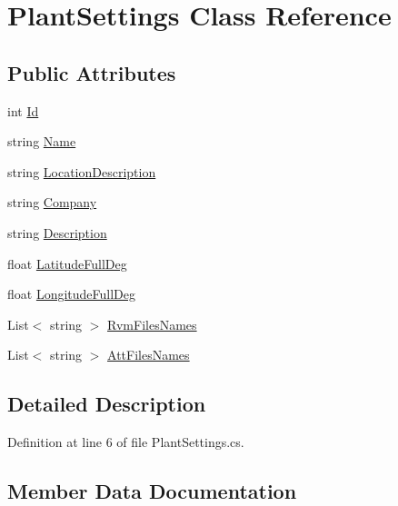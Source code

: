 \hypertarget{class_plant_settings}{}\section{Plant\+Settings Class Reference}
\label{class_plant_settings}
\subsection*{Public Attributes}
\begin{DoxyCompactItemize}
\item 
int \mbox{\hyperlink{class_plant_settings_a1f2ff2b67f41524fa46c571179c94520}{Id}}
\item 
string \mbox{\hyperlink{class_plant_settings_a177bfddd185ddca1d0784c1a40c2b1e5}{Name}}
\item 
string \mbox{\hyperlink{class_plant_settings_a2bbf2e3449fb49879511e48455fcb61c}{Location\+Description}}
\item 
string \mbox{\hyperlink{class_plant_settings_a1c1f7e402e63c8d9bbcb91e56cc1e4df}{Company}}
\item 
string \mbox{\hyperlink{class_plant_settings_af526aceb5c55f8d2fa36fc7633179827}{Description}}
\item 
float \mbox{\hyperlink{class_plant_settings_a188bcd3b0e807284256f4fe8ac12bde5}{Latitude\+Full\+Deg}}
\item 
float \mbox{\hyperlink{class_plant_settings_a8710d8ee2ca86ec19eda05fb5aaf0c76}{Longitude\+Full\+Deg}}
\item 
List$<$ string $>$ \mbox{\hyperlink{class_plant_settings_a0585d33a62c175024d74037aa4de491b}{Rvm\+Files\+Names}}
\item 
List$<$ string $>$ \mbox{\hyperlink{class_plant_settings_a09b724758164500cd3bd159d5815a6f4}{Att\+Files\+Names}}
\end{DoxyCompactItemize}


\subsection{Detailed Description}


Definition at line 6 of file Plant\+Settings.\+cs.



\subsection{Member Data Documentation}
\mbox{\label{class_plant_settings_a09b724758164500cd3bd159d5815a6f4}} 

